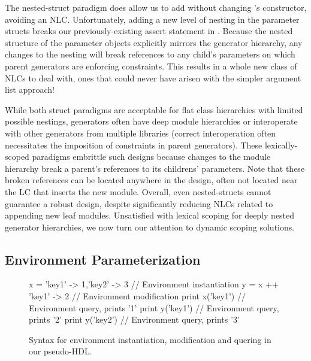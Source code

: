 The nested-struct paradigm does allow us to add  without changing 's constructor, avoiding an NLC.
Unfortunately, adding a new level of nesting in the parameter structs breaks our previously-existing assert statement in . 
Because the nested structure of the parameter objects explicitly mirrors the generator hierarchy,
any changes to the nesting will break references to any child's parameters on which parent generators are enforcing constraints.
This results in a whole new class of NLCs to deal with, ones that could never have arisen with the simpler argument list approach!

While both struct paradigms are acceptable for flat class hierarchies with limited possible nestings,
generators often have deep module hierarchies or interoperate with other generators from multiple libraries
(correct interoperation often necessitates the imposition of constraints in parent generators).
These lexically-scoped paradigms embrittle such designs because changes to the module hierarchy break a parent's references to its childrens' parameters. 
Note that these broken references can be located anywhere in the design, often not located near the LC that inserts the new module.
Overall, even nested-structs cannot guarantee a robust design, despite significantly reducing NLCs related to appending new leaf modules.
Unsatisfied with lexical scoping for deeply nested generator hierarchies, we now turn our attention to dynamic scoping solutions.

\subsection{Environment Parameterization}
\label{sec:env}

\begin{figure}
\centering
\begin{phdl}
x = {'key1' -> 1,'key2' -> 3} // Environment instantiation
y = x ++ {'key1' -> 2}        // Environment modification
print x('key1')               // Environment query, prints '1'
print y('key1')               // Environment query, prints '2'
print y('key2')               // Environment query, prints '3'
\end{phdl}
\caption{Syntax for environment instantiation, modification and quering in our pseudo-HDL.}
\label{fig:env-phdl}
\end{figure}


